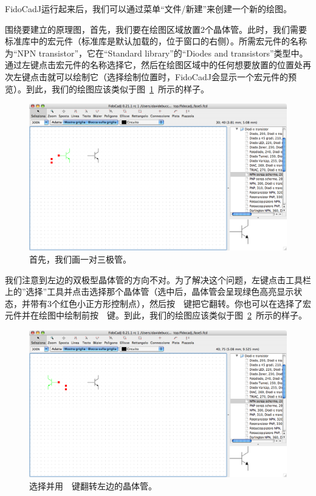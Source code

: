 \documentclass[10pt,a4paper,twoside]{scrreprt}
\newcommand{\keyevidence}[1]{\fbox{#1}}
\begin{document}
FidoCadJ运行起来后，我们可以通过菜单“文件/新建”来创建一个新的绘图。

围绕要建立的原理图，首先，我们要在绘图区域放置2个晶体管。此时，我们需要标准库中的宏元件（标准库是默认加载的，位于窗口的右侧）。所需宏元件的名称为{}“NPN transistor”，它在{}“Standard library”的{}“Diodes and transistors”类型中。通过左键点击宏元件的名称选择它，然后在绘图区域中的任何想要放置的位置处再次左键点击就可以绘制它（选择绘制位置时，FidoCadJ会显示一个宏元件的预览）。到此，我们的绘图应该类似于图~\ref{fig_fidocadj_fase1}~所示的样子。

\begin{figure}
\includegraphics[width=1\textwidth,]{fidocadj_fase1} 
\caption{首先，我们画一对三极管。}
\label{fig_fidocadj_fase1} 
\end{figure}

我们注意到左边的双极型晶体管的方向不对。为了解决这个问题，左键点击工具栏上的{}”选择”工具并点击选择那个晶体管（选中后，晶体管会呈现绿色高亮显示状态，并带有3个红色小正方形控制点），然后按~\keyevidence{S}~键把它翻转。你也可以在选择了宏元件并在绘图中绘制前按~\keyevidence{S}~键。到此，我们的绘图应该类似于图~\ref{fig_fidocadj_fase2}~所示的样子。

\begin{figure}
\includegraphics[width=1\textwidth,]{fidocadj_fase2} 
\caption{选择并用~\keyevidence{S}~键翻转左边的晶体管。}
\label{fig_fidocadj_fase2} 
\end{figure}
\end{document}
